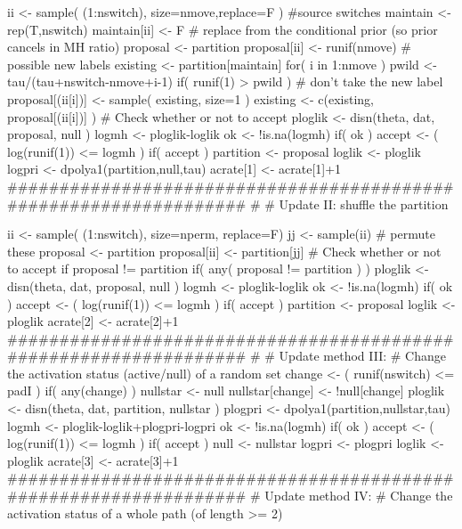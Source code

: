 \begin{Examples}
\begin{ExampleCode}
{{    ii <- sample( (1:nswitch), size=nmove,replace=F ) #source switches
    maintain <- rep(T,nswitch)
    maintain[ii] <- F
    # replace from the conditional prior (so prior cancels in MH ratio)
    proposal <- partition
    proposal[ii] <- runif(nmove)  # possible new labels
    existing <- partition[maintain]
    for( i in 1:nmove )
      {
       pwild <- tau/(tau+nswitch-nmove+i-1)
       if( runif(1) > pwild ) # don't take the new label
         { proposal[(ii[i])] <- sample( existing, size=1 ) }
       existing <- c(existing, proposal[(ii[i])] )
      }
    # Check whether or not to accept
    ploglik <- disn(theta, dat, proposal, null )
    logmh <- ploglik-loglik
    ok <- !is.na(logmh)
    if( ok )
     {
      accept <- ( log(runif(1)) <= logmh )
      if( accept )
       {
        partition <- proposal
        loglik <-  ploglik
        logpri <- dpolya1(partition,null,tau)
        acrate[1] <- acrate[1]+1
       }
     }
    ##################################################################
    #
    # Update II: shuffle the partition

    ii <- sample( (1:nswitch), size=nperm, replace=F)
    jj <- sample(ii)  # permute these
    proposal <- partition
    proposal[ii] <- partition[jj]
    # Check whether or not to accept if proposal != partition
    if( any( proposal != partition ) )
     {
      ploglik <- disn(theta, dat, proposal, null )
      logmh <- ploglik-loglik
      ok <- !is.na(logmh)
      if( ok )
       {
        accept <- ( log(runif(1)) <= logmh )
        if( accept )
          {
            partition <- proposal
            loglik <-  ploglik
            acrate[2] <- acrate[2]+1
           }
         }
       }
    ##################################################################
    #
    # Update method III:
    #   Change the activation status (active/null) of a random set
    change <- ( runif(nswitch) <= padI )
    if( any(change) )
     {
      nullstar <- null
      nullstar[change] <- !null[change]
      ploglik <- disn(theta, dat, partition, nullstar )
      plogpri <- dpolya1(partition,nullstar,tau)
      logmh <- ploglik-loglik+plogpri-logpri
      ok <- !is.na(logmh)
      if( ok )
       {
        accept <- ( log(runif(1)) <= logmh )
        if( accept )
         {
          null <- nullstar
          logpri <- plogpri
          loglik <- ploglik
          acrate[3] <- acrate[3]+1
         }
       }
     }
    ##################################################################
    # Update method IV:
    #   Change the activation status of a whole path (of length >= 2)
     
}}
\end{ExampleCode}
\end{Examples}
